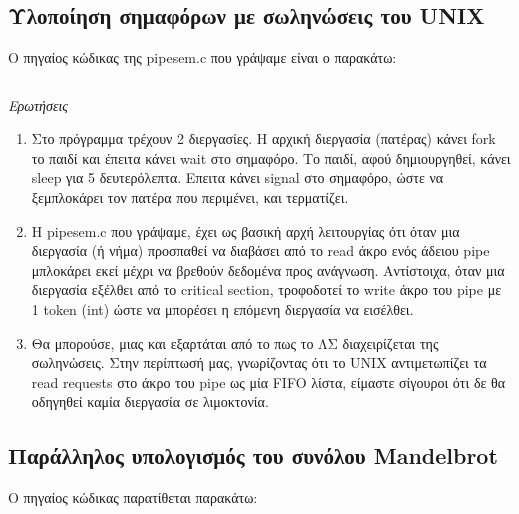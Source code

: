 \documentclass[a4paper,10pt]{article} \usepackage{anysize}
\begin{document}


\section*{} \setcounter{section}{1}
\subsection{Υλοποίηση σημαφόρων με σωληνώσεις του UNIX} 
Ο πηγαίος κώδικας της pipesem.c που γράψαμε είναι ο παρακάτω:
\inputminted[linenos,fontsize=\footnotesize,frame=leftline]{c}{files/pipesem.c}

\newpage
\emph{Ερωτήσεις}
\begin{enumerate}
\item Στο πρόγραμμα τρέχουν 2 διεργασίες. Η αρχική διεργασία (πατέρας) κάνει fork το παιδί και έπειτα κάνει wait στο σημαφόρο.
Το παιδί, αφού δημιουργηθεί, κάνει sleep για 5 δευτερόλεπτα. Επειτα κάνει signal στο σημαφόρο, ώστε να ξεμπλοκάρει τον πατέρα που περιμένει, και τερματίζει.
\item H pipesem.c που γράψαμε, έχει ως βασική αρχή λειτουργίας ότι όταν μια διεργασία (ή νήμα) προσπαθεί να διαβάσει από το read άκρο ενός άδειου pipe
μπλοκάρει εκεί μέχρι να βρεθούν δεδομένα προς ανάγνωση. Αντίστοιχα, όταν μια διεργασία εξέλθει από το critical section, τροφοδοτεί το write άκρο του
pipe με 1 token (int) ώστε να μπορέσει η επόμενη διεργασία να εισέλθει.
\item Θα μπορούσε, μιας και εξαρτάται από το πως το ΛΣ διαχειρίζεται της σωληνώσεις. Στην περίπτωσή μας, γνωρίζοντας ότι το UNIX αντιμετωπίζει τα
read requests στο άκρο του pipe ως μία FIFO λίστα, είμαστε σίγουροι ότι δε θα οδηγηθεί καμία διεργασία σε λιμοκτονία.\\
\end{enumerate}


\subsection{Παράλληλος υπολογισμός του συνόλου Mandelbrot} 
Ο πηγαίος κώδικας παρατίθεται παρακάτω:
\inputminted[linenos,fontsize=\footnotesize,frame=leftline]{c}{files/mandel.c}
\end{document}
